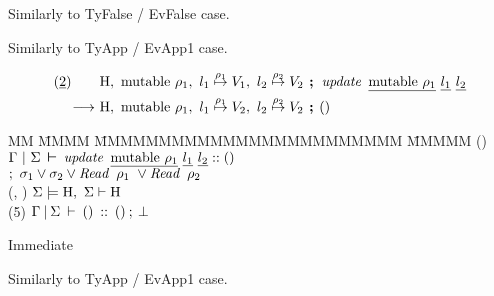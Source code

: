 \begin{flushleft}
\bigskip

Similarly to TyFalse / EvFalse case.

\bigskip

Similarly to TyApp / EvApp1 case.

\bigskip

$$ 
	\begin{aligned}
	  (\un{2}) \qq
	  	 & \heap	, \ \rmutable \ \rho_1
			, \ l_1 \mapstoa{\rho_1} V_1
			, \ l_2 \mapstoa{\rho_2} V_2
			\with \iupdate \
				\underline{\textrm{mutable $\rho_1$}} \ 
				\un{l_1} \ 
				\un{l_2} \\
		  	\eto  
		  & \heap , \ \rmutable \ \rho_1
			, \ l_1 \mapstoa{\rho_1} V_2
			, \ l_2 \mapstoa{\rho_2} V_2
			\with ()
	  \end{aligned}
$$
\begin{tabbing}
MM \= MMMM \= MMMMMMMMMMMMMMMMMMMMMMMM \= MMMMM  \kill
\>	() 
		\> $\Gamma \ \vert \ \Sigma \judge \iupdate \ \un{\rmutable \ \rho_1} \ \un{l_1} \ \un{l_2} :: ()$
\\[0.2ex]
\>		\> \hspace{6ex} $ ; {\ \sigma_1 \lor \sigma_2 \lor \iRead \ \rho_1 \ \lor \iRead \ \rho_2}$
		\> \pby{assume}
\\[1ex]
\>	(\un{3}, \un{4}) 
		\> $\Sigma \models \textrm{H}, \ \Sigma \vdash \textrm{H}$
		\>  
\\[1ex]
\>	(5) 	\> $\Gamma \: \arrowvert \: \Sigma \: \vdash \: () \: :: \: () \: ; \: \bot$
		\> 
\end{tabbing}


\bigskip

Immediate


\bigskip

Similarly to TyApp / EvApp1 case.



\end{flushleft}
